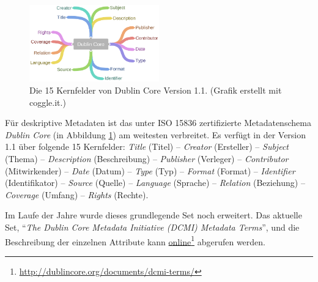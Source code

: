 \begin{figure}
  \begin{center}
    \includegraphics[width=0.5\textwidth]{bilder/doku_dublinCore}
  \end{center}
  \caption{Die 15 Kernfelder von Dublin Core Version 1.1. (Grafik erstellt mit coggle.it.)}
  \label{doku_dublinCore}
\end{figure}
Für deskriptive Metadaten ist das unter ISO 15836 zertifizierte Metadatenschema \emph{Dublin Core} (in Abbildung \ref{doku_dublinCore}) am weitesten verbreitet. Es verfügt in der Version 1.1 über folgende 15 Kernfelder: \emph{Title} (Titel) -- \emph{Creator} (Ersteller) -- \emph{Subject} (Thema) -- \emph{Description} (Beschreibung) -- \emph{Publisher} (Verleger) -- \emph{Contributor} (Mitwirkender) -- \emph{Date} (Datum) -- \emph{Type} (Typ) -- \emph{Format} (Format) -- \emph{Identifier} (Identifikator) -- \emph{Source} (Quelle) -- \emph{Language} (Sprache) -- \emph{Relation} (Beziehung) -- \emph{Coverage} (Umfang) -- \emph{Rights} (Rechte).

Im Laufe der Jahre wurde dieses grundlegende Set noch erweitert. Das aktuelle Set, "`\emph{The Dublin Core Metadata Initiative (DCMI) Metadata Terms}"', und die Beschreibung der einzelnen Attribute kann \href{http://dublincore.org/documents/dcmi-terms/}{online}\footnote{\href{http://dublincore.org/documents/dcmi-terms/}{http://dublincore.org/documents/dcmi-terms/}} abgerufen werden.

